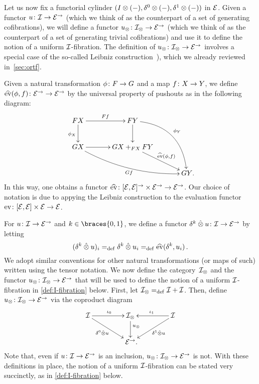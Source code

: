 \documentclass[reqno,10pt,a4paper,oneside,draft]{amsart}
\begin{document}
Let us now fix a functorial cylinder $(\interval \otimes (-), \lcyl \otimes (-), \rcyl \otimes (-))$ in $\calE$.
Given a functor $u \co \cal{I} \to \catE^\to$ (which we think of as the counterpart of a set of generating cofibrations), we will define a functor $u_\otimes \co \cal{I}_\otimes \to \catE^\to$ (which we think of as the counterpart of a set of generating trivial cofibrations) and use it to define the notion of a uniform $\cal{I}$-fibration.
The definition of $u_\otimes \co \cal{I}_\otimes \to \catE^\to$ involves a special case of the so-called Leibniz construction~\cite{riehl-verity:reedy}), which we already reviewed in~\cref{sec:ortf}.

Given a natural transformation $\phi \co F \to G$ and a map $f \co X \to Y$, we define $\hateval(\phi, f) \co \catE^\to \to \catE^\to$ by the universal property of pushouts as in the following diagram:
\begin{equation} \label{definition-of-hateval}
\begin{aligned}
\xymatrix@C=1.2cm{
  FX
  \ar[r]^{Ff}
  \ar[d]_{\phi_X}
&
  FY
  \ar@/^2pc/[ddr]^{\phi_Y}
  \ar[d]
&\\
  GX
  \ar@/_1pc/[drr]_{Gf}
  \ar[r]
&
  GX +_{FX} FY
  \ar[dr]^-{\hateval(\phi, f)}
&\\&&
  GY
\rlap{.}}
\end{aligned}
\end{equation}
In this way, one obtains a functor $\hateval \co [\catE, \catE]^\to \times \catE^\to \to \catE^\to$.
Our choice of notation is due to appying the Leibniz construction to the evaluation functor $\eval \co [\catE,\catE] \times \calE \to \catE$.

For $u \co \cal{I} \to \catE^\to$ and $k \in \braces{0, 1}$, we define a functor $\kcyl \hatotimes u \co \cal{I} \to \catE^\to$ by letting
\[
  (\kcyl \hatotimes u)_i \defeq \kcyl \hatotimes u_i  \defeq \hateval(\kcyl, u_i) \, .
\]
We adopt similar conventions for other natural transformations (or maps of such) written using the tensor notation.
We now define the category~$\cal{I}_\otimes$ and the functor $u_\otimes \co \cal{I}_\otimes \to \catE^\to$ that will be used to define the notion of a uniform $\cal{I}$-fibration in \cref{def:I-fibration} below.
First, let $\cal{I}_\otimes \defeq \cal{I} + \cal{I}$.
Then, define $u_\otimes \co \cal{I}_\otimes \to \catE^\to$ via the coproduct diagram
\begin{equation} \label{equ:u-tensor}
\begin{gathered}
\xymatrix@C+2em{
  \cal{I}
  \ar[r]^{\iota_0}
  \ar[dr]_-{\lcyl \hatotimes u}
&
  \cal{I}_\otimes
  \ar[d]^(.4){u_\otimes}
&
  \cal{I}
  \ar[dl]^-{\rcyl \hatotimes u}
  \ar[l]_{\iota_1}
\\&
  \catE^\to
\rlap{.}}
\end{gathered}
\end{equation}
Note that, even if $u \co \cal{I} \to \catE^\to$ is an inclusion, $u_\otimes \co \cal{I}_\otimes \to \catE^\to$ is not.
With these definitions in place, the notion of a uniform $\cal{I}$-fibration can be stated very succinctly, as in \cref{def:I-fibration} below.
\end{document}
